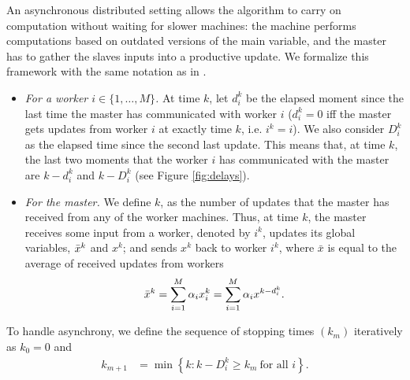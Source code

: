 An asynchronous distributed setting allows the algorithm to carry on computation without waiting for slower machines: the machine performs computations based on outdated versions of the main variable, and the master has to gather the slaves inputs into a productive update. We formalize this framework with the same notation as in \cite{mishchenko2018}. 
\begin{itemize}
    \item \emph{For a worker $i\in\{1,\ldots,M\}$.} At time $k$, let $d_i^k$ be the elapsed moment since the last time the master has communicated with worker $i$ ($d_i^k = 0$ iff the master gets updates from worker $i$ at exactly time $k$, i.e. $i^k=i$). We also consider  $D_i^k$ as the elapsed time since the second last update. This means that, at time $k$, the last two moments that the worker $i$ has communicated with the master are $k-d_i^k$ and $k-D_i^k$ (see Figure \ref{fig:delays}). 
    \item \emph{For the master.} We define $k$, as the number of updates that the master has received from any of the worker machines. Thus, at time $k$, the master receives some input from a worker, denoted by $i^k$, updates its global variables, $\bar{x}^k$ and $x^k$; and sends $x^k$ back to worker $i^k$, where $\bar{x}$ is equal to the average of received updates from workers
    \begin{equation}\label{eq:barx}
    \bar{x}^k = \sum_{i=1}^M\alpha_i x_i^k = \sum_{i=1}^M \alpha_i x^{k-d_i^k}.
    \end{equation}
    \end{itemize}
To handle asynchrony, we define the sequence of stopping times $(k_m)$  iteratively as $k_0 = 0$ and
\begin{align}
\label{eq:km}
k_{m+1} &= \min\left\{ k : k- D_i^k \geq k_m ~\text{for all $i$} \right\}.
\end{align}

